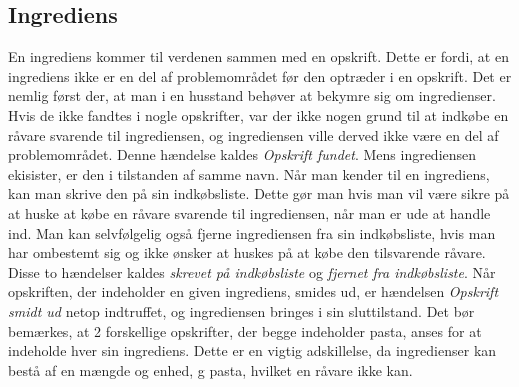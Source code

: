 \subsection{Ingrediens}

En ingrediens kommer til verdenen sammen med en opskrift. Dette er fordi, at en ingrediens ikke er en del af problemområdet før den optræder i en opskrift. Det er nemlig først der, at man i en husstand behøver at bekymre sig om ingredienser. Hvis de ikke fandtes i nogle opskrifter, var der ikke nogen grund til at indkøbe en råvare svarende til ingrediensen, og ingrediensen ville derved ikke være en del af problemområdet. Denne hændelse kaldes \textit{Opskrift fundet}. Mens ingrediensen ekisister, er den i tilstanden af samme navn. Når man kender til en ingrediens, kan man skrive den på sin indkøbsliste. Dette gør man hvis man vil være sikre på at huske at købe en råvare svarende til ingrediensen, når man er ude at handle ind. Man kan selvfølgelig også fjerne ingrediensen fra sin indkøbsliste, hvis man har ombestemt sig og ikke ønsker at huskes på at købe den tilsvarende råvare. Disse to hændelser kaldes \textit{skrevet på indkøbsliste} og \textit{fjernet fra indkøbsliste}. Når opskriften, der indeholder en given ingrediens, smides ud, er hændelsen \textit{Opskrift smidt ud} netop indtruffet, og ingrediensen bringes i sin sluttilstand. Det bør bemærkes, at 2 forskellige opskrifter, der begge indeholder pasta, anses for at indeholde hver sin ingrediens. Dette er en vigtig adskillelse, da ingredienser kan bestå af en mængde og enhed,  g pasta, hvilket en råvare ikke kan.

\begin{figure}[H]
	\centering
	\scalebox{0.6}{
	}
	\label{fig:ingrediens-adfaerd}
\end{figure}